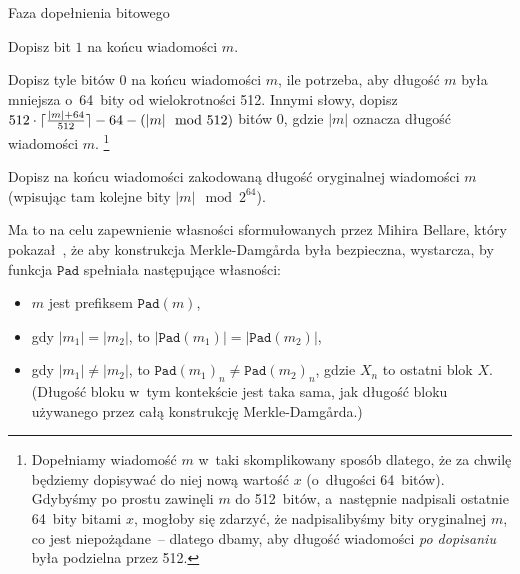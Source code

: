 \begin{myenumerate}

    \item Faza dopełnienia bitowego

    \begin{myenumerate}

        \item Dopisz bit $1$ na końcu wiadomości $m$.

        \item Dopisz tyle bitów $0$ na końcu wiadomości $m$, ile potrzeba, aby
        długość $m$ była mniejsza o~64~bity od wielokrotności 512. Innymi
        słowy, dopisz $512 \cdot \lceil\frac{|m|+64}{512}\rceil-64-(|m| \mod{512})$
        bitów $0$, gdzie $|m|$ oznacza długość wiadomości $m$.
        \footnote{Dopełniamy wiadomość $m$ w~taki skomplikowany sposób dlatego,
        że za chwilę będziemy dopisywać do niej nową wartość $x$ (o~długości
        64~bitów). Gdybyśmy po prostu zawinęli $m$ do 512~bitów, a~następnie
        nadpisali ostatnie 64~bity bitami $x$, mogłoby się zdarzyć, że
        nadpisalibyśmy bity oryginalnej $m$, co jest niepożądane~-- dlatego
        dbamy, aby długość wiadomości \emph{po dopisaniu} była podzielna przez
        512.}

        \item Dopisz na końcu wiadomości zakodowaną długość oryginalnej
        wiadomości $m$ (wpisując tam kolejne bity $|m| \mod{2^{64}}$).

        Ma to na celu zapewnienie własności sformułowanych przez Mihira
        Bellare, który pokazał~\cite{merkle_damgard_strengthening}, że aby
        konstrukcja Merkle-Damg\r{a}rda była bezpieczna, wystarcza, by funkcja
        $\mathtt{Pad}$ spełniała następujące własności:

        \begin{itemize}

            \item $m$ jest prefiksem $\mathtt{Pad}(m)$,

            \item gdy $|m_1| = |m_2|$, to $|\mathtt{Pad}(m_1)| =
            |\mathtt{Pad}(m_2)|$,

            \item gdy $|m_1| \neq |m_2|$, to $\mathtt{Pad}(m_1)_n \neq
            \mathtt{Pad}(m_2)_n$, gdzie $X_n$ to ostatni blok $X$. (Długość
            bloku w~tym kontekście jest taka sama, jak długość bloku używanego
            przez całą konstrukcję Merkle-Damg\r{a}rda.)


\end{itemize}
\end{myenumerate}
\end{myenumerate}
